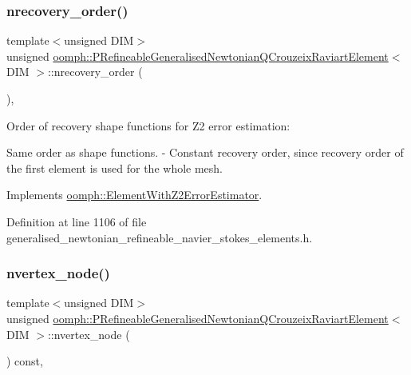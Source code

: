 \subsubsection{\texorpdfstring{nrecovery\+\_\+order()}{nrecovery\_order()}}
{\footnotesize\ttfamily template$<$unsigned D\+IM$>$ \\
unsigned \hyperlink{classoomph_1_1PRefineableGeneralisedNewtonianQCrouzeixRaviartElement}{oomph\+::\+P\+Refineable\+Generalised\+Newtonian\+Q\+Crouzeix\+Raviart\+Element}$<$ D\+IM $>$\+::nrecovery\+\_\+order (\begin{DoxyParamCaption}{ }\end{DoxyParamCaption})\hspace{0.3cm}{\ttfamily [inline]}, {\ttfamily [virtual]}}



Order of recovery shape functions for Z2 error estimation\+: 


\begin{DoxyItemize}
\item Same order as shape functions. -\/ Constant recovery order, since recovery order of the first element is used for the whole mesh. 
\end{DoxyItemize}

Implements \hyperlink{classoomph_1_1ElementWithZ2ErrorEstimator_af39480835bd3e0f6b2f4f7a9a4044798}{oomph\+::\+Element\+With\+Z2\+Error\+Estimator}.



Definition at line 1106 of file generalised\+\_\+newtonian\+\_\+refineable\+\_\+navier\+\_\+stokes\+\_\+elements.\+h.

\mbox{\label{classoomph_1_1PRefineableGeneralisedNewtonianQCrouzeixRaviartElement_ad41a2cd5f7ba136c2db47404e23b3bff}} 
\subsubsection{\texorpdfstring{nvertex\+\_\+node()}{nvertex\_node()}}
{\footnotesize\ttfamily template$<$unsigned D\+IM$>$ \\
unsigned \hyperlink{classoomph_1_1PRefineableGeneralisedNewtonianQCrouzeixRaviartElement}{oomph\+::\+P\+Refineable\+Generalised\+Newtonian\+Q\+Crouzeix\+Raviart\+Element}$<$ D\+IM $>$\+::nvertex\+\_\+node (\begin{DoxyParamCaption}{ }\end{DoxyParamCaption}) const\hspace{0.3cm}{\ttfamily [inline]}, {\ttfamily [virtual]}}



